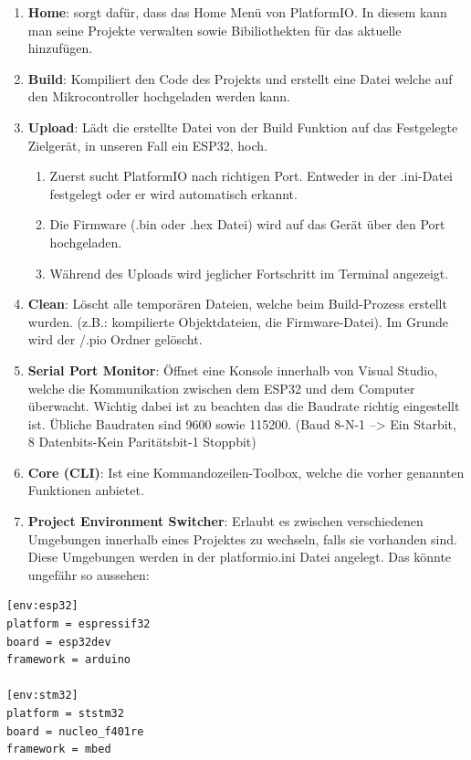 \documentclass[
    headings=optiontotocandhead,%
    twoside,
    numbers=noenddot,%
    12pt, %
    titlepage, %
    parskip=full, %
    listof=leveldown, 
    numbers=noenddot, %
    a4paper,DIV=14,
    BCOR=15mm,
]{scrbook}
\providecommand{\tightlist}{%
  \setlength{\itemsep}{0pt}\setlength{\parskip}{0pt}}
\begin{document}
\begin{enumerate}
\def\labelenumi{\arabic{enumi}.}
\tightlist
\item
  \textbf{Home}: sorgt dafür, dass das Home Menü von PlatformIO. In
  diesem kann man seine Projekte verwalten sowie Bibiliothekten für das
  aktuelle hinzufügen.
\item
  \textbf{Build}: Kompiliert den Code des Projekts und erstellt eine
  Datei welche auf den Mikrocontroller hochgeladen werden kann.
\item
  \textbf{Upload}: Lädt die erstellte Datei von der Build Funktion auf
  das Festgelegte Zielgerät, in unseren Fall ein ESP32, hoch.

  \begin{enumerate}
  \def\labelenumii{\arabic{enumii}.}
  \tightlist
  \item
    Zuerst sucht PlatformIO nach richtigen Port. Entweder in der
    .ini-Datei festgelegt oder er wird automatisch erkannt.
  \item
    Die Firmware (.bin oder .hex Datei) wird auf das Gerät über den Port
    hochgeladen.
  \item
    Während des Uploads wird jeglicher Fortschritt im Terminal
    angezeigt.
  \end{enumerate}
\item
  \textbf{Clean}: Löscht alle temporären Dateien, welche beim
  Build-Prozess erstellt wurden. (z.B.: kompilierte Objektdateien, die
  Firmware-Datei). Im Grunde wird der /.pio Ordner gelöscht.
\item
  \textbf{Serial Port Monitor}: Öffnet eine Konsole innerhalb von Visual
  Studio, welche die Kommunikation zwischen dem ESP32 und dem Computer
  überwacht. Wichtig dabei ist zu beachten das die Baudrate richtig
  eingestellt ist. Übliche Baudraten sind 9600 sowie 115200. (Baud 8-N-1
  --\textgreater{} Ein Starbit, 8 Datenbits-Kein Paritätsbit-1 Stoppbit)
\item
  \textbf{Core (CLI)}: Ist eine Kommandozeilen-Toolbox, welche die
  vorher genannten Funktionen anbietet.
\item
  \textbf{Project Environment Switcher}: Erlaubt es zwischen
  verschiedenen Umgebungen innerhalb eines Projektes zu wechseln, falls
  sie vorhanden sind. Diese Umgebungen werden in der platformio.ini
  Datei angelegt. Das könnte ungefähr so aussehen:
\end{enumerate}

\begin{lstlisting}[caption={Beispiel Von Mehreren Umgebungen in PlatfromIO}]
[env:esp32]
platform = espressif32
board = esp32dev
framework = arduino

[env:stm32]
platform = ststm32
board = nucleo_f401re
framework = mbed
\end{lstlisting}
\end{document}
